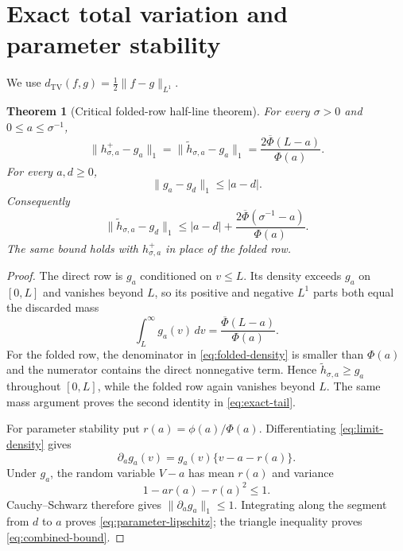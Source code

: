 \documentclass[11pt]{article}
\newtheorem{theorem}{Theorem}[section]
\theoremstyle{remark}
\newcommand{\TV}{\mathrm{TV}}
\begin{document}
\section{Exact total variation and parameter stability}

We use $d_{\TV}(f,g)=\tfrac12\|f-g\|_{L^1}$.

\begin{theorem}[Critical folded-row half-line theorem]\label{thm:main}
For every $\sigma>0$ and $0\le a\le\sigma^{-1}$,
\begin{equation}\label{eq:exact-tail}
 \|h^+_{\sigma,a}-g_a\|_1
 =\|\widetilde h_{\sigma,a}-g_a\|_1
 =\frac{2\overline\Phi(L-a)}{\Phi(a)}.
\end{equation}
For every $a,d\ge0$,
\begin{equation}\label{eq:parameter-lipschitz}
 \|g_a-g_d\|_1\le |a-d|.
\end{equation}
Consequently
\begin{equation}\label{eq:combined-bound}
 \boxed{
 \|\widetilde h_{\sigma,a}-g_d\|_1
 \le |a-d|+
 \frac{2\overline\Phi(\sigma^{-1}-a)}{\Phi(a)}.}
\end{equation}
The same bound holds with $h^+_{\sigma,a}$ in place of the folded row.
\end{theorem}

\begin{proof}
The direct row is $g_a$ conditioned on $v\le L$.  Its density exceeds $g_a$
on $[0,L]$ and vanishes beyond $L$, so its positive and negative $L^1$
parts both equal the discarded mass
\[
 \int_L^\infty g_a(v)\,dv
 =\frac{\overline\Phi(L-a)}{\Phi(a)}.
\]
For the folded row, the denominator in \eqref{eq:folded-density} is smaller
than $\Phi(a)$ and the numerator contains the direct nonnegative term.
Hence $\widetilde h_{\sigma,a}\ge g_a$ throughout $[0,L]$, while the folded
row again vanishes beyond $L$.  The same mass argument proves the second
identity in \eqref{eq:exact-tail}.

For parameter stability put $r(a)=\phi(a)/\Phi(a)$.  Differentiating
\eqref{eq:limit-density} gives
\[
 \partial_a g_a(v)=g_a(v)\{v-a-r(a)\}.
\]
Under $g_a$, the random variable $V-a$ has mean $r(a)$ and variance
\[
 1-a r(a)-r(a)^2\le1.
\]
Cauchy--Schwarz therefore gives
$\|\partial_a g_a\|_1\le1$.  Integrating along the segment from $d$ to $a$
proves \eqref{eq:parameter-lipschitz}; the triangle inequality proves
\eqref{eq:combined-bound}.
\end{proof}
\end{document}
